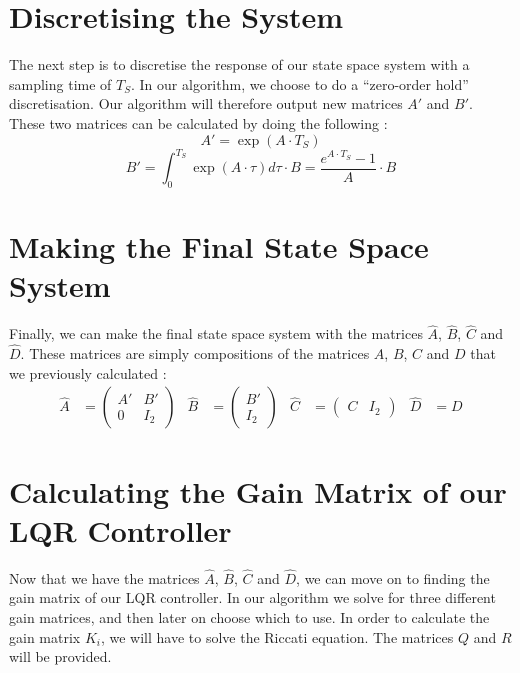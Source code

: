 \documentclass[a4paper, 11pt]{article}
\begin{document}
\section{Discretising the System}
The next step is to discretise the response of our state space system with a sampling time of $T_S$. In our algorithm, we choose to do a \enquote{zero-order hold} discretisation. Our algorithm will therefore output new matrices $A'$ and $B'$. These two matrices can be calculated by doing the following :
\begin{equation}
	A' = \exp\left(A\cdot T_S \right)
\end{equation}
\begin{equation}
	B' = \int_0^{T_S} \exp\left(A\cdot \tau \right) d\tau\cdot B = \frac{e^{A\cdot T_S} - 1}{A}\cdot B
\end{equation}

\section{Making the Final State Space System}
Finally, we can make the final state space system with the matrices $\hat{A}$, $\hat{B}$, $\hat{C}$ and $\hat{D}$. These matrices are simply compositions of the matrices $A$, $B$, $C$ and $D$ that we previously calculated :
\begin{align*}
	\hat{A} &= \begin{pmatrix}
		A' & B'\\
		0 & I_2
	\end{pmatrix} & \hat{B} &= \begin{pmatrix}
		B'\\
		I_2
	\end{pmatrix} & \hat{C} &= \begin{pmatrix}
		C & I_2
	\end{pmatrix} & \hat{D} &= D
\end{align*}

\section{Calculating the Gain Matrix of our LQR Controller}

Now that we have the matrices $\hat{A}$, $\hat{B}$, $\hat{C}$ and $\hat{D}$, we can move on to finding the gain matrix of our LQR controller. In our algorithm we solve for three different gain matrices, and then later on choose which to use. In order to calculate the gain matrix $K_i$, we will have to solve the Riccati equation. The matrices $Q$ and $R$ will be provided.\\
\end{document}
